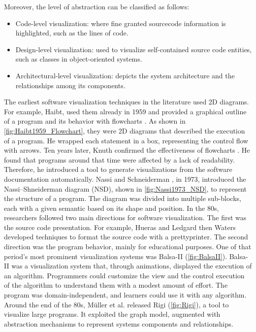 Moreover, the level of abstraction can be classified as follows:
\begin{itemize}
	\item Code-level visualization: where fine granted sourcecode information is highlighted, such as the lines of code. 
	\item Design-level visualization: used to visualize self-contained source code entities, such as classes in object-oriented systems. 
	\item Architectural-level visualization: depicts the system architecture and the relationships among its components. 
\end{itemize}



The earliest software visualization techniques in the literature used 2D diagrams. 
For example, Haibt, used them already in 1959 and provided a graphical outline of a program and its behavior with flowcharts \cite{Haibt1959}. 
As shown in \autoref{fig:Haibt1959_Flowchart}, they were 2D diagrams that described the execution of a program.
He wrapped each statement in a box, representing the control flow with arrows.
Ten years later, Knuth confirmed the effectiveness of flowcharts \cite{Knuth1963}. 
He found that programs around that time were affected by a lack of readability.
Therefore, he introduced a tool to generate visualizations from the software documentation automatically.
Nassi and Schneiderman \cite{Nassi1973}, in 1973, introduced the Nassi–Shneiderman diagram (NSD), shown in \autoref{fig:Nassi1973_NSD}, to represent the structure of a program. 
The diagram was divided into multiple sub-blocks, each with a given semantic based on its shape and position. 
In the 80s, researchers followed two main directions for software visualization. The first was the source code presentation.
For example, Hueras and Ledgard \cite{Hueras1977} then Waters \cite{Waters1983} developed techniques to format the source code with a prettyprinter. 
The second direction was the program behavior, mainly for educational purposes.
One of that period's most prominent visualization systems was Balsa-II \cite{Brown1988} (\autoref{fig:BalsaII}).
Balsa-II was a visualization system that, through animations, displayed the execution of an algorithm.
Programmers could customize the view and the control execution of the algorithm to understand them with a modest amount of effort. 
The program was domain-independent, and learners could use it with any algorithm. 
Around the end of the 80s, Müller et al. \cite{Mueller1988} released Rigi (\autoref{fig:Rigi}), a tool to visualize large programs.
It exploited the graph model, augmented with abstraction mechanisms to represent systems components and relationships. 

